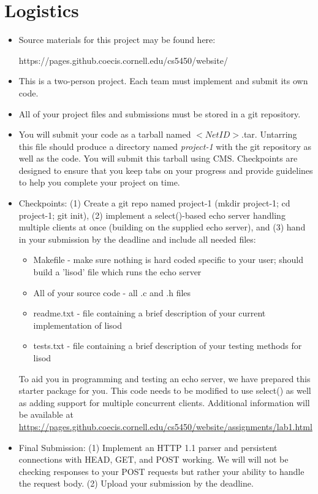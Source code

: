 \documentclass[12pt]{article}
\begin{document}
\section{Logistics}
\begin{itemize}
\item  Source materials for this project may be found here:

https://pages.github.coecis.cornell.edu/cs5450/website/

\item  This is a two-person project.  Each team must implement and submit
its own code.

\item  All of your project files and submissions must be stored in a
git repository.

\item You will submit your code as a tarball named
$<NetID>$.tar. Untarring this file should produce a directory named
\textit{project-1} with the git repository as well as the code.  You will
submit this tarball using CMS.  Checkpoints are designed to ensure that
you keep tabs on your progress and provide guidelines to help you complete
your project on time.

\item Checkpoints: (1) Create a git repo named project-1 (mkdir project-1;
cd project-1; git init), (2) implement a select()-based echo server
handling multiple clients at once (building on the supplied echo server),
and (3) hand in your submission by the deadline and include all needed
files:

\begin{itemize}
\item Makefile - make sure nothing is hard coded specific to your user;
should build a 'lisod' file which runs the echo server

\item All of your source code - all .c and .h files

\item readme.txt - file containing a brief description of your current
implementation of lisod

\item tests.txt - file containing a brief description of your testing
methods for lisod
\end{itemize}

To aid you in programming and testing an echo server, we have
prepared this starter package for you.  This code needs to be
modified to use select() as well as adding support for multiple
concurrent clients. Additional information will be available at
\url{https://pages.github.coecis.cornell.edu/cs5450/website/assignments/lab1.html}

\item Final Submission: (1) Implement an HTTP 1.1 parser and persistent
connections with HEAD, GET, and POST working.  We will will not be
checking responses to your POST requests but rather your ability to
handle the request body. (2) Upload your submission by the deadline.

\end{itemize}
\end{document}

